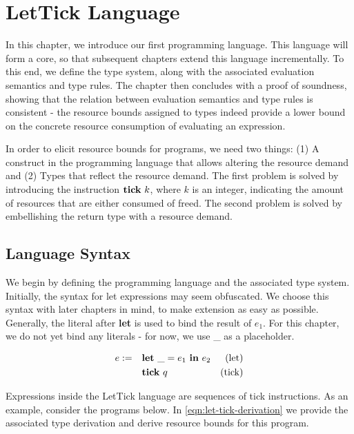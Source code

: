 \chapter{LetTick Language}

In this chapter, we introduce our first programming language. This language will form a core, so that subsequent chapters extend this language incrementally. To this end, we define the type system, along with the associated evaluation semantics and type rules. The chapter then concludes with a proof of soundness, showing that the relation between evaluation semantics and type rules is consistent - the resource bounds assigned to types indeed provide a lower bound on the concrete resource consumption of evaluating an expression.

In order to elicit resource bounds for programs, we need two things: (1) A construct in the programming language that allows altering the resource demand and (2) Types that reflect the resource demand. The first problem is solved by introducing the instruction \(\mathbf{tick}~k\), where \(k\) is an integer, indicating the amount of resources that are either consumed of freed. The second problem is solved by embellishing the return type with a resource demand.

\section{Language Syntax}
We begin by defining the programming language and the associated type system. Initially, the syntax for let expressions may seem obfuscated. We choose this syntax with later chapters in mind, to make extension as easy as possible. Generally, the literal after \textbf{let} is used to bind the result of \(e_1\). For this chapter, we do not yet bind any literals - for now, we use \_ as a placeholder.

\begin{definition}
   \label{def:prog-lang-4}

\begin{align*}
   e := ~~~ & \mathbf{let}~\_ = e_1~\mathbf{in}~e_2             & \text{(let)}\\
            & \mathbf{tick}~q                         & \text{(tick)}
\end{align*}
\end{definition}

Expressions inside the LetTick language are sequences of tick instructions. As an example, consider the programs below. In \cref{eqn:let-tick-derivation} we provide the associated type derivation and derive resource bounds for this program.

